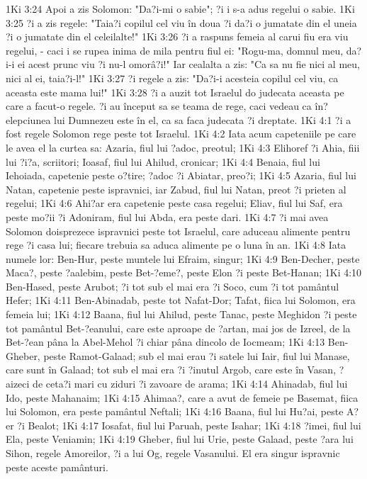 1Ki 3:24  Apoi a zis Solomon: "Da?i-mi o sabie"; ?i i s-a adus regelui o sabie.
1Ki 3:25  ?i a zis regele: "Taia?i copilul cel viu în doua ?i da?i o jumatate din el uneia ?i o jumatate din el celeilalte!"
1Ki 3:26  ?i a raspuns femeia al carui fiu era viu regelui, - caci i se rupea inima de mila pentru fiul ei: "Rogu-ma, domnul meu, da?i-i ei acest prunc viu ?i nu-l omorâ?i!" Iar cealalta a zis: "Ca sa nu fie nici al meu, nici al ei, taia?i-l!"
1Ki 3:27  ?i regele a zis: "Da?i-i acesteia copilul cel viu, ca aceasta este mama lui!"
1Ki 3:28  ?i a auzit tot Israelul do judecata aceasta pe care a facut-o regele. ?i au început sa se teama de rege, caci vedeau ca în?elepciunea lui Dumnezeu este în el, ca sa faca judecata ?i dreptate.
1Ki 4:1  ?i a fost regele Solomon rege peste tot Israelul.
1Ki 4:2  Iata acum capeteniile pe care le avea el la curtea sa: Azaria, fiul lui ?adoc, preotul;
1Ki 4:3  Elihoref ?i Ahia, fiii lui ?i?a, scriitori; Ioasaf, fiul lui Ahilud, cronicar;
1Ki 4:4  Benaia, fiul lui Iehoiada, capetenie peste o?tire; ?adoc ?i Abiatar, preo?i;
1Ki 4:5  Azaria, fiul lui Natan, capetenie peste ispravnici, iar Zabud, fiul lui Natan, preot ?i prieten al regelui;
1Ki 4:6  Ahi?ar era capetenie peste casa regelui; Eliav, fiul lui Saf, era peste mo?ii ?i Adoniram, fiul lui Abda, era peste dari.
1Ki 4:7  ?i mai avea Solomon doisprezece ispravnici peste tot Israelul, care aduceau alimente pentru rege ?i casa lui; fiecare trebuia sa aduca alimente pe o luna în an.
1Ki 4:8  Iata numele lor: Ben-Hur, peste muntele lui Efraim, singur;
1Ki 4:9  Ben-Decher, peste Maca?, peste ?aalebim, peste Bet-?eme?, peste Elon ?i peste Bet-Hanan;
1Ki 4:10  Ben-Hased, peste Arubot; ?i tot sub el mai era ?i Soco, cum ?i tot pamântul Hefer;
1Ki 4:11  Ben-Abinadab, peste tot Nafat-Dor; Tafat, fiica lui Solomon, era femeia lui;
1Ki 4:12  Baana, fiul lui Ahilud, peste Tanac, peste Meghidon ?i peste tot pamântul Bet-?eanului, care este aproape de ?artan, mai jos de Izreel, de la Bet-?ean pâna la Abel-Mehol ?i chiar pâna dincolo de Iocmeam;
1Ki 4:13  Ben-Gheber, peste Ramot-Galaad; sub el mai erau ?i satele lui Iair, fiul lui Manase, care sunt în Galaad; tot sub el mai era ?i ?inutul Argob, care este în Vasan, ?aizeci de ceta?i mari cu ziduri ?i zavoare de arama;
1Ki 4:14  Ahinadab, fiul lui Ido, peste Mahanaim;
1Ki 4:15  Ahimaa?, care a avut de femeie pe Basemat, fiica lui Solomon, era peste pamântul Neftali;
1Ki 4:16  Baana, fiul lui Hu?ai, peste A?er ?i Bealot;
1Ki 4:17  Iosafat, fiul lui Paruah, peste Isahar;
1Ki 4:18  ?imei, fiul lui Ela, peste Veniamin;
1Ki 4:19  Gheber, fiul lui Urie, peste Galaad, peste ?ara lui Sihon, regele Amoreilor, ?i a lui Og, regele Vasanului. El era singur ispravnic peste aceste pamânturi.
